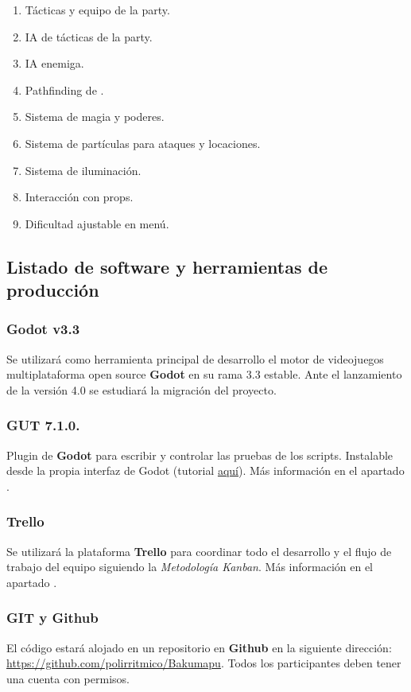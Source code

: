 \begin{enumerate}
\begin{enumerate}[noitemsep]
	\end{enumerate}
	\item Tácticas y equipo de la party.
	\item IA de tácticas de la party.
	\item IA enemiga.
	\item Pathfinding de .
	\item Sistema de magia y poderes.
	\item Sistema de partículas para ataques y locaciones.
	\item Sistema de iluminación.
	\item Interacción con props.
	\item Dificultad ajustable en menú.
\end{enumerate}

\subsection{Listado de software y herramientas de producción}\label{intro:software-y-herramientas}

\subsubsection{Godot v3.3}
Se utilizará como herramienta principal de desarrollo el motor de videojuegos multiplataforma open source \textbf{Godot} en su rama 3.3 estable. Ante el lanzamiento de la versión 4.0 se estudiará la migración del proyecto.

\subsubsection*{\small GUT 7.1.0.}
Plugin de \textbf{Godot} para escribir y controlar las pruebas de los scripts. Instalable desde la propia interfaz de Godot (tutorial \href{https://www.youtube.com/watch?v=5DrhMiuLRl0}{aquí}). Más información en el apartado .

\subsubsection{Trello}
Se utilizará la plataforma \textbf{Trello} para coordinar todo el desarrollo y el flujo de trabajo del equipo siguiendo la \emph{Metodología Kanban}. Más información en el apartado .

\subsubsection{GIT y Github}
El código estará alojado en un repositorio  en \textbf{Github} en la siguiente dirección: \url{https://github.com/polirritmico/Bakumapu}. Todos los participantes deben tener una cuenta con permisos.

